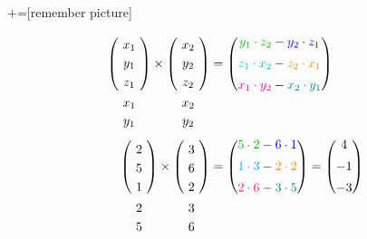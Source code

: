 \documentclass[11pt]{beamer}
\newcommand{\vektor}[1]{
\begin{pmatrix}
	#1
\end{pmatrix}
}
\begin{document}
\begin{frame}[plain]
+=[remember picture]

\begin{align*} 
\underset{\begin{matrix} \tikz[baseline]\node (x11) {$x_1$}; \\ \tikz[baseline]\node (y11) {$y_1$}; \end{matrix}}%
	{\vektor{\tikz[baseline]\node (x1) {$x_1$}; \\ \tikz[baseline]\node (y1) {$y_1$}; \\ \tikz[baseline]\node (z1) {$z_1$};}} 
\times \underset{\begin{matrix} \tikz[baseline]\node (x22) {$x_2$}; \\ \tikz[baseline]\node (y22) {$y_2$}; \end{matrix}}%
	{\vektor{\tikz[baseline]\node (x2) {$x_2$}; \\ \tikz[baseline]\node (y2) {$y_2$}; \\ \tikz[baseline]\node (z2) {$z_2$};}}
&= \vektor{\color{green!70!black}y_1\cdot z_2 \color{black} - \color{blue} y_2\cdot z_1 \\[0.5em] 
	\color{cyan}z_1\cdot x_2 \color{black} - \color{orange} z_2\cdot x_1 \\[0.5em] 
	\color{magenta}x_1\cdot y_2 \color{black} - \color{teal} x_2\cdot y_1} \\
\underset{\begin{matrix} \tikz[baseline]\node (x33) {$2$}; \\ \tikz[baseline]\node (y33) {$5$}; \end{matrix}}
	{\vektor{\tikz[baseline]\node (x3) {$2$}; \\ \tikz[baseline]\node (y3) {$5$}; \\ \tikz[baseline]\node (z3) {$1$};}} 
\times \underset{\begin{matrix} \tikz[baseline]\node (x44) {$3$}; \\ \tikz[baseline]\node (y44) {$6$}; \end{matrix}}
	{\vektor{\tikz[baseline]\node (x4) {$3$}; \\ \tikz[baseline]\node (y4) {$6$}; \\ \tikz[baseline]\node (z4) {$2$};}}
&= \vektor{\color{green!70!black}5\cdot 2 \color{black} - \color{blue} 6\cdot 1 \\[0.5em] 
		\color{cyan}1\cdot 3 \color{black} - \color{orange} 2\cdot 2 \\[0.5em] 
		\color{magenta}2\cdot 6 \color{black} - \color{teal} 3\cdot 5}
= \vektor{4 \\[0.5em] -1 \\[0.5em] -3}
\end{align*}
\end{frame}
\end{document}
